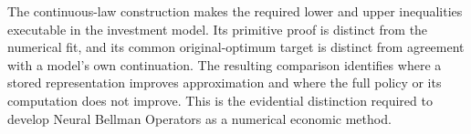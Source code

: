 \documentclass[ecta,nameyear,draft]{econsocart}
\begin{document}
The continuous-law construction makes the required lower and upper inequalities executable in the investment model. Its primitive proof is distinct from the numerical fit, and its common original-optimum target is distinct from agreement with a model's own continuation. The resulting comparison identifies where a stored representation improves approximation and where the full policy or its computation does not improve. This is the evidential distinction required to develop Neural Bellman Operators as a numerical economic method.



\end{document}
